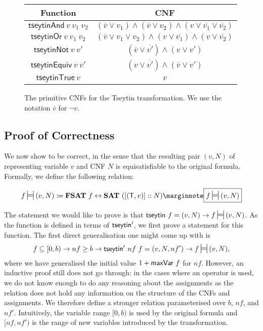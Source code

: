 \begin{figure}
  \begin{center}
    \begin{tabular}{c|c} 
      Function & CNF \\
      \midrule{}
      $\textsf{tseytinAnd}~v~v_1~v_2$ & $(\overline{v} \lor v_1) \land (\overline{v} \lor v_2) \land (v \lor \overline{v_1} \lor \overline{v_2})$ \\
      $\textsf{tseytinOr}~v~v_1~v_2$ & $(\overline{v} \lor v_1 \lor v_2) \land (v \lor \overline{v_1}) \land (v \lor \overline{v_2})$ \\
      $\textsf{tseytinNot}~v~v'$ & $(\overline{v} \lor \overline{v'}) \land (v \lor v')$ \\
      $\textsf{tseytinEquiv}~v~v'$ & $(v \lor \overline{v'}) \land (\overline{v} \lor v')$ \\
      $\textsf{tseytinTrue}~v$ & $v$ 
    \end{tabular}
  \end{center}
  \caption{The primitive CNFs for the Tseytin transformation. We use the notation $\overline{v}$ for $\lnot v$.}\label{fig:prim_cnfs}
\end{figure}

\subsection{Proof of Correctness}
We now show \tseytin{} to be correct, in the sense that the resulting pair $(v, N)$ of representing variable $v$ and CNF $N$ is equisatisfiable to the original formula. Formally, we define the following relation:
\newcommand{\frepr}{\sdststile{}{}}
\begin{definition}
  \[ f \frepr{} (v, N) \defeq \fsat{}~f \leftrightarrow \SAT{}~([(\btrue, v)] :: N) \mnote{$f \frepr{} (v, N)$}\]
\end{definition}

The statement we would like to prove is that $\tseytin~f = (v, N) \rightarrow f \frepr{} (v, N)$. As the function is defined in terms of $\textsf{tseytin}'$, we first prove a statement for this function. The first direct generalisation one might come up with is
\[f \subseteq [0, b) \rightarrow nf \ge b \rightarrow \tseytin'~nf~f = (v, N, nf') \rightarrow f \frepr{} (v, N), \]
where we have generalised the initial value $1 +{\textsf{maxVar}~f}$ for $nf$.
However, an inductive proof still does not go through: in the cases where an operator is used, we do not know enough to do any reasoning about the assignments as the relation does not hold any information on the structure of the CNFs and assignments. 
We therefore define a stronger relation parameterised over $b$, $nf$, and $nf'$. Intuitively, the variable range $[0, b)$ is used by the original formula and $[nf, nf')$ is the range of new variables introduced by the transformation.

